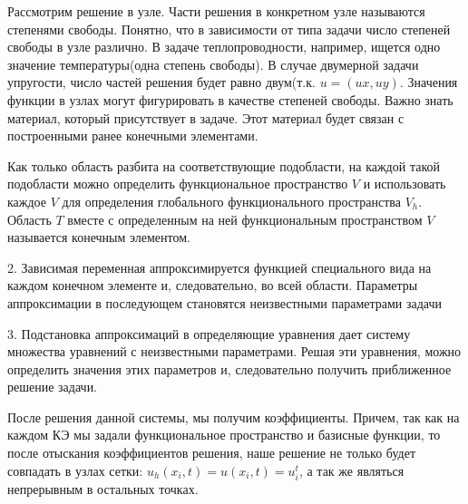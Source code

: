 Рассмотрим решение в узле. Части решения в конкретном узле называются степенями свободы.
Понятно, что в зависимости от типа задачи число степеней свободы
в узле различно. В задаче теплопроводности, например, ищется одно значение температуры(одна степень свободы)\cite{bib:thomas}.
В случае двумерной задачи упругости, число частей решения будет равно двум(т.к. $u=(ux, uy)$.
    Значения функции в узлах могут фигурировать в качестве степеней свободы.
Важно знать материал, который присутствует в задаче. Этот материал будет связан с построенными ранее конечными элементами.

Как только область разбита на соответствующие подобласти, на каждой такой подобласти можно 
определить функциональное пространство $V$ и использовать каждое $V$ для определения глобального
функционального пространства $V_h$. Область $T$ вместе с определенным на ней функциональным пространством $V$ называется конечным элементом. 


2. Зависимая переменная аппроксимируется функцией специального вида на каждом конечном элементе и, следовательно, во всей области.
Параметры аппроксимации в последующем становятся неизвестными параметрами задачи

3. Подстановка аппроксимаций в определяющие уравнения дает систему множества уравнений с неизвестными параметрами. Решая эти уравнения, можно определить 
значения этих параметров и, следовательно получить приближенное решение задачи.

После решения данной системы, мы получим коэффициенты. Причем, так как на каждом КЭ 
мы задали функциональное пространство и базисные функции, то после отыскания
коэффициентов решения, наше решение не только будет совпадать в узлах сетки: $u_h(x_i, t) = u(x_i, t) = u_i^t$,
а так же являться непрерывным в остальных точках\cite{bib:mke-introduction}.
